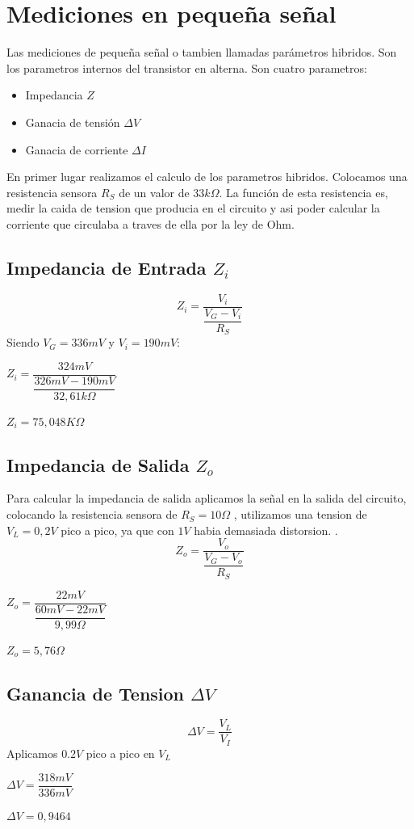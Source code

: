 \documentclass[12pt]{article}
\begin{document}
\section{Mediciones en pequeña señal}
Las mediciones de pequeña señal o tambien llamadas parámetros hibridos.
Son los parametros internos del transistor en alterna. Son cuatro parametros:

\begin{itemize}
\item Impedancia $Z$
\item Ganacia de tensión $\Delta V$
\item Ganacia de corriente $\Delta I$
\end{itemize}
En primer lugar realizamos el calculo de los parametros hibridos.
Colocamos una resistencia sensora $R_S$ de un valor de $33 k\Omega$. La función de esta resistencia es, medir la caida de tension que producia en el circuito y asi poder calcular la corriente que circulaba a traves de ella por la ley de Ohm.

\subsection{Impedancia de Entrada $Z_i$}
\begin{equation}
 Z_i=\dfrac{V_i}{\dfrac{V_G-V_i}{R_S}}
\end{equation}
Siendo $V_G=336mV$ y $V_i=190mV$:
\begin{center}
 $Z_i=\dfrac{324mV}{\dfrac{326mV-190mV}{32,61k\Omega}}$
 
 $Z_i=75,048K\Omega$
\end{center}

\subsection{Impedancia de Salida $Z_o$}
Para calcular la impedancia de salida aplicamos la señal en la salida del circuito, colocando la resistencia sensora de $R_S=10 \Omega$ , utilizamos una tension de $V_L=0,2V$ pico a pico, ya que con $1V$ habia demasiada distorsion.  .
\begin{equation}
 Z_o=\dfrac{V_o}{\dfrac{V_G-V_o}{R_S}}
\end{equation}
\begin{center}
 $Z_o=\dfrac{22mV}{\dfrac{60mV-22mV}{9,99\Omega}}$
 
 $Z_o=5,76\Omega$
\end{center}

\subsection{Ganancia de Tension $\Delta V$}
\begin{equation}
 \Delta V=\frac{V_L}{V_I}
\end{equation}
\vspace{0.2cm}
Aplicamos $0.2V$ pico a pico en $V_L$
\begin{center}
 $\Delta V=\dfrac{318mV}{336mV}$
 
 $\Delta V=0,9464$
\end{center}
\end{document}
